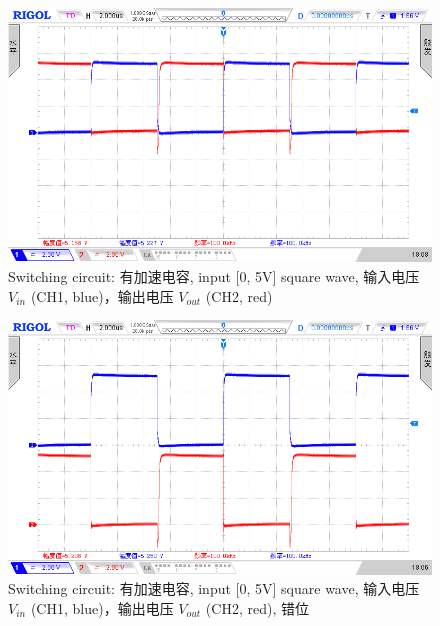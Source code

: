 \documentclass[UTF8]{article}
\begin{document}
\begin{figure}[H]\centering
    \includegraphics[width=\columnwidth]{LCE-02-三极管/assets/开关电路 有加速电容, input 100 kHz.png}
    \caption{Switching circuit: 有加速电容, input [0, 5V] square wave, 输入电压 $V_{in}$ (CH1, blue)，输出电压 $V_{out}$ (CH2, red)}
\end{figure}

\begin{figure}[H]\centering
    \includegraphics[width=\columnwidth]{LCE-02-三极管/assets/开关电路 有加速电容 (错位), input 100 kHz.png}
    \caption{Switching circuit: 有加速电容,  input [0, 5V] square wave, 输入电压 $V_{in}$ (CH1, blue)，输出电压 $V_{out}$ (CH2, red), 错位}
\end{figure}

\newpage
\end{document}
